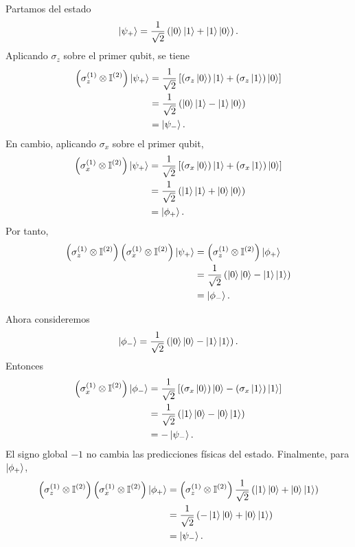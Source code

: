 \documentclass[12pt,a4paper]{article}
\theoremstyle{definition}
\theoremstyle{plain}
\theoremstyle{remark}
\newcommand{\I}{\mathbb{I}}
\begin{document}
Partamos del estado
\begin{equation*}
    \ket{\psi_+}=\frac{1}{\sqrt{2}}\left(\ket{0}\ket{1}+\ket{1}\ket{0}\right).
\end{equation*}
Aplicando $\sigma_z$ sobre el primer qubit, se tiene
\begin{align*}
    \left(\sigma_z^{(1)}\otimes\I^{(2)}\right)\ket{\psi_+}
    &=\frac{1}{\sqrt{2}}\left[
    \left(\sigma_z\ket{0}\right)\ket{1}
    +\left(\sigma_z\ket{1}\right)\ket{0}
    \right]\\
    &=\frac{1}{\sqrt{2}}\left(\ket{0}\ket{1}-\ket{1}\ket{0}\right)\\
    &=\ket{\psi_-}.
\end{align*}
En cambio, aplicando $\sigma_x$ sobre el primer qubit,
\begin{align*}
    \left(\sigma_x^{(1)}\otimes\I^{(2)}\right)\ket{\psi_+}
    &=\frac{1}{\sqrt{2}}\left[
    \left(\sigma_x\ket{0}\right)\ket{1}
    +\left(\sigma_x\ket{1}\right)\ket{0}
    \right]\\
    &=\frac{1}{\sqrt{2}}\left(\ket{1}\ket{1}+\ket{0}\ket{0}\right)\\
    &=\ket{\phi_+}.
\end{align*}
Por tanto,
\begin{align*}
    \left(\sigma_z^{(1)}\otimes\I^{(2)}\right)
    \left(\sigma_x^{(1)}\otimes\I^{(2)}\right)
    \ket{\psi_+}
    &=\left(\sigma_z^{(1)}\otimes\I^{(2)}\right)\ket{\phi_+}\\
    &=\frac{1}{\sqrt{2}}\left(\ket{0}\ket{0}-\ket{1}\ket{1}\right)\\
    &=\ket{\phi_-}.
\end{align*}

Ahora consideremos
\begin{equation*}
    \ket{\phi_-}=\frac{1}{\sqrt{2}}\left(\ket{0}\ket{0}-\ket{1}\ket{1}\right).
\end{equation*}
Entonces
\begin{align*}
    \left(\sigma_x^{(1)}\otimes\I^{(2)}\right)\ket{\phi_-}
    &=\frac{1}{\sqrt{2}}\left[
    \left(\sigma_x\ket{0}\right)\ket{0}
    -\left(\sigma_x\ket{1}\right)\ket{1}
    \right]\\
    &=\frac{1}{\sqrt{2}}\left(\ket{1}\ket{0}-\ket{0}\ket{1}\right)\\
    &=-\ket{\psi_-}.
\end{align*}
El signo global $-1$ no cambia las predicciones físicas del estado. Finalmente, para $\ket{\phi_+}$,
\begin{align*}
    \left(\sigma_z^{(1)}\otimes\I^{(2)}\right)
    \left(\sigma_x^{(1)}\otimes\I^{(2)}\right)\ket{\phi_+}
    &=\left(\sigma_z^{(1)}\otimes\I^{(2)}\right)
    \frac{1}{\sqrt{2}}\left(\ket{1}\ket{0}+\ket{0}\ket{1}\right)\\
    &=\frac{1}{\sqrt{2}}\left(-\ket{1}\ket{0}+\ket{0}\ket{1}\right)\\
    &=\ket{\psi_-}.
\end{align*}
\end{document}
